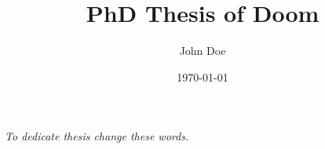 \documentclass[titlepage,shield]{hwthesis}
\let\oldapp\appendix
\renewcommand{\appendix}{\oldapp\renewcommand*{\chaptername}{\appendixname}}
\begin{document}

\title{PhD Thesis of Doom}


\date{\today} %

\author{John Doe} %


\maketitle
{}
\ifx\submissiontype\firstsub%
\mbox{}
\fi%

\begin{abstract}

\end{abstract}
\ifx\submissiontype\firstsub%
\mbox{}
\fi%

\clearpage
\vspace*{12cm}
\hfil
\hspace{6.5cm}
\textit{To dedicate thesis change these words.}
\clearpage
\ifx\submissiontype\firstsub%
\mbox{}
\clearpage
\fi%

\begin{acknowledgements}

\end{acknowledgements}
\ifx\submissiontype\firstsub%
\mbox{}
\fi%

\ifx\submissiontype\arxivsub%
\relax
\else%

\ifx\submissiontype\firstsub%
\mbox{}
\fi%
\fi%

\clearpage
\setcounter{page}{1}

\tableofcontents

\clearpage
{}




\appendix 





\clearpage
\end{document}
